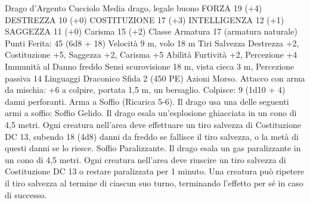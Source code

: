 \begin{multicols}{2}
Drago d’Argento Cucciolo
Media drago, legale buono
FORZA 19 (+4)
DESTREZZA 10 (+0)
COSTITUZIONE 17 (+3)
INTELLIGENZA 12 (+1)
SAGGEZZA 11 (+0)
Carisma 15 (+2)
Classe Armatura 17 (armatura naturale)
\hspace*{0pt}\hfill{Punti Ferita}: 45 (6d8 + 18)
Velocità 9 m, volo 18 m
Tiri Salvezza Destrezza +2, Costituzione +5, Saggezza +2,
Carisma +5
Abilità Furtività +2, Percezione +4
Immunità al Danno freddo
Sensi scurovisione 18 m, vista cieca 3 m, Percezione passiva 14
Linguaggi Draconico
Sfida 2 (450 PE)
Azioni
Morso. Attacco con arma da mischia: +6 a colpire, portata 1,5
m, un bersaglio.
Colpisce: 9 (1d10 + 4) danni perforanti.
Arma a Soffio (Ricarica 5-6). Il drago usa una delle seguenti armi
a soffio:
Soffio Gelido. Il drago esala un’esplosione ghiacciata in un cono di
4,5 metri. Ogni creatura nell’area deve effettuare un tiro salvezza di
Costituzione DC 13, subendo 18 (4d8) danni da freddo se fallisce il
tiro salvezza, o la metà di questi danni se lo riesce.
Soffio Paralizzante. Il drago esala un gas paralizzante in un cono di
4,5 metri. Ogni creatura nell’area deve riuscire un tiro salvezza di
Costituzione DC 13 o restare paralizzata per 1 minuto. Una creatura
può ripetere il tiro salvezza al termine di ciascun suo turno,
terminando l’effetto per sé in caso di successo.
 

\end{multicols}
